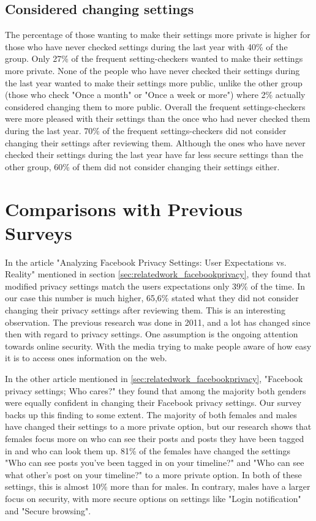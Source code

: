 \subsection{Considered changing settings}
The percentage of those wanting to make their settings more private is higher for those who have never checked settings during the last year with 40\% of the group. Only 27\% of the frequent setting-checkers wanted to make their settings more private. 
None of the people who have never checked their settings during the last year wanted to make their settings more public, unlike the other group (those who check "Once a month" or "Once a week or more") where 2\% actually considered changing them to more public. Overall the frequent settings-checkers were more pleased with their settings than the once who had never checked them during the last year. 70\% of the frequent settings-checkers did not consider changing their settings after reviewing them. Although the ones who have never checked their settings during the last year have far less secure settings than the other group, 60\% of them did not consider changing their settings either. 

\section{Comparisons with Previous Surveys} 
In the article "Analyzing Facebook Privacy Settings: User Expectations vs. Reality" mentioned in section \ref{sec:relatedwork_facebookprivacy}, they found that modified privacy settings match the users expectations only 39\% of the time. In our case this number is much higher, 65,6\% stated what they did not consider changing their privacy settings after reviewing them. This is an interesting observation. The previous research was done in 2011, and a lot has changed since then with regard to privacy settings. One assumption is the ongoing attention towards online security. With the media trying to make people aware of how easy it is to access ones information on the web. 

In the other article mentioned in \ref{sec:relatedwork_facebookprivacy}, "Facebook privacy settings; Who cares?" they found that among the majority both genders were equally confident in changing their Facebook privacy settings. Our survey backs up this finding to some extent. The majority of both females and males have changed their settings to a more private option, but our research shows that females focus more on who can see their posts and posts they have been tagged in and who can look them up. 81\% of the females have changed the settings "Who can see posts you've been tagged in on your timeline?" and "Who can see what other's post on your timeline?" to a more private option. In both of these settings, this is almost 10\% more than for males. In contrary, males have a larger focus on security, with more secure options on settings like "Login notification" and "Secure browsing". 


